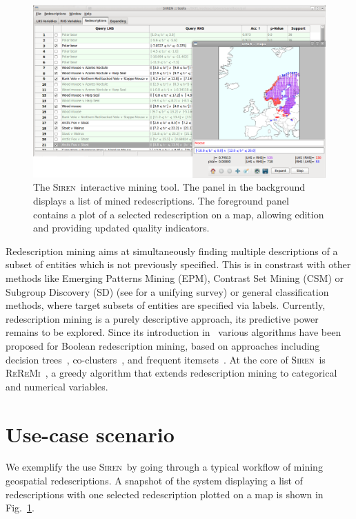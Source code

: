 \documentclass{sig-alternate}
\newcommand{\Siren}{\textsc{Siren}}
\newcommand{\ReReMi}{\textsc{ReReMi}}
\begin{document}

\begin{figure}[t]
  \centering
\includegraphics[width=\textwidth]{screenshots/both_panels_02.png}
  \caption{The \Siren\ interactive mining tool. The panel in the background displays a list of mined redescriptions. The foreground panel contains a plot of a selected redescription on a map, allowing edition and providing updated quality indicators.}
  \label{fig:both_panels}
\end{figure}

Redescription mining aims at simultaneously finding multiple
descriptions of a subset of entities which is not previously
specified.  This is in constrast with other methods like Emerging
Patterns Mining (EPM), Contrast Set Mining (CSM) or Subgroup Discovery
(SD) (see \cite{kralj09supervised} for a unifying survey) or general
classification methods, where target subsets of entities are specified
via labels.  Currently, redescription mining is a purely descriptive
approach, its predictive power remains to be explored.  Since its
introduction in~\cite{ramakrishnan04turning} various algorithms have
been proposed for Boolean redescription mining, based on approaches
including decision
trees~\cite{ramakrishnan04turning,kumar07redescription},
co-clusters~\cite{parida05redescription}, and frequent
itemsets~\cite{gallo08finding}.  At the core of \Siren\ is
\ReReMi~\cite{galbrun11black}, a greedy algorithm that extends
redescription mining to categorical and numerical variables.

\section{Use-case scenario}
\label{sec:scenarios}
We exemplify the use \Siren\ by going through a typical workflow of
mining geospatial redescriptions.  A snapshot of the system
displaying a list of redescriptions with one
selected redescription plotted on a map is shown in
Fig.~\ref{fig:both_panels}.
\end{document}
